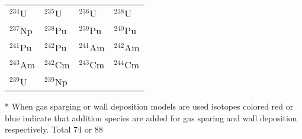 \begin{table}[htbp]
\begin{threeparttable}
\begin{tabular}{C{3cm}C{3cm}C{3cm}C{3cm}}
    ${}^{234}$U & ${}^{235}$U & ${}^{236}$U & ${}^{238}$U \\  
    ${}^{237}$Np & ${}^{238}$Pu & ${}^{239}$Pu & ${}^{240}$Pu \\
    ${}^{241}$Pu & ${}^{242}$Pu & ${}^{241}$Am & ${}^{242}$Am \\
    ${}^{243}$Am & ${}^{242}$Cm & ${}^{243}$Cm & ${}^{244}$Cm \\
    ${}^{239}$U	& ${}^{239}$Np & & \\
    \hline
    \end{tabular}
    \begin{tablenotes}\footnotesize
    \item[*] When gas sparging or wall deposition models are used isotopes colored red or blue indicate that addition species are added for gas sparing and wall deposition respectively. Total 74 or 88 
    
   \end{tablenotes}
   \end{threeparttable}
\end{table}

